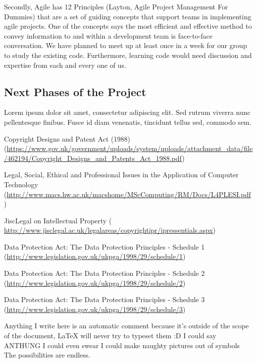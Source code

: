 	Secondly, Agile has 12 Principles (Layton, Agile Project Management For Dummies) that are a set of guiding concepts that support teams in implementing agile projects. One of the concepts says the most efficient and effective method to convey information to and within a development team is face-to-face conversation. We have planned to meet up at least once in a week for our group to study the existing code. Furthermore, learning code would need discussion and expertise from each and every one of us. 

\subsection*{Next Phases of the Project}
Lorem ipsum dolor sit amet, consectetur adipiscing elit. Sed rutrum viverra nunc pellentesque finibus. Fusce id diam venenatis, tincidunt tellus sed, commodo sem.

\newpage
\begin{thebibliography}{99}

 Copyright Designs and Patent Act (1988)
\newline
(\url{https://www.gov.uk/government/uploads/system/uploads/attachment_data/file/462194/Copyright_Designs_and_Patents_Act_1988.pdf})

 Legal, Social, Ethical and Professional Issues in the Application of Computer Technology 
\newline
(\url{http://www.macs.hw.ac.uk/macshome/MScComputing/RM/Docs/L4PLESI.pdf})

 JiscLegal on Intellectual Property
\newline
(\url{ http://www.jisclegal.ac.uk/legalareas/copyrightipr/ipressentials.aspx})

 Data Protection Act: The Data Protection Principles - Schedule 1
\newline
(\url{http://www.legislation.gov.uk/ukpga/1998/29/schedule/1})

 Data Protection Act: The Data Protection Principles - Schedule 2
\newline
(\url{http://www.legislation.gov.uk/ukpga/1998/29/schedule/2})

 Data Protection Act: The Data Protection Principles - Schedule 3
\newline
(\url{http://www.legislation.gov.uk/ukpga/1998/29/schedule/3})

\end{thebibliography}



Anything I write here is an automatic comment because it's outside of the scope of the document, LaTeX will never try to typeset them :D
I could say ANTHUNG
I could even swear
I could make naughty pictures out of symbols
The possibilities are endless.
